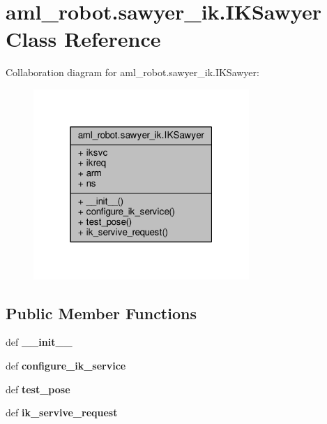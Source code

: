 \hypertarget{classaml__robot_1_1sawyer__ik_1_1_i_k_sawyer}{\section{aml\-\_\-robot.\-sawyer\-\_\-ik.\-I\-K\-Sawyer Class Reference}
\label{classaml__robot_1_1sawyer__ik_1_1_i_k_sawyer}
}


Collaboration diagram for aml\-\_\-robot.\-sawyer\-\_\-ik.\-I\-K\-Sawyer\-:\nopagebreak
\begin{figure}[H]
\begin{center}
\leavevmode
\includegraphics[width=232pt]{classaml__robot_1_1sawyer__ik_1_1_i_k_sawyer__coll__graph}
\end{center}
\end{figure}
\subsection*{Public Member Functions}
\begin{DoxyCompactItemize}
\item 
\hypertarget{classaml__robot_1_1sawyer__ik_1_1_i_k_sawyer_a65178d63636b88d3d2e408e935c99942}{def {\bfseries \-\_\-\-\_\-init\-\_\-\-\_\-}}\label{classaml__robot_1_1sawyer__ik_1_1_i_k_sawyer_a65178d63636b88d3d2e408e935c99942}

\item 
\hypertarget{classaml__robot_1_1sawyer__ik_1_1_i_k_sawyer_a00d497c052f10e0aa35725d2f3b10011}{def {\bfseries configure\-\_\-ik\-\_\-service}}\label{classaml__robot_1_1sawyer__ik_1_1_i_k_sawyer_a00d497c052f10e0aa35725d2f3b10011}

\item 
\hypertarget{classaml__robot_1_1sawyer__ik_1_1_i_k_sawyer_a979a1ec545060a095c80780032d9e357}{def {\bfseries test\-\_\-pose}}\label{classaml__robot_1_1sawyer__ik_1_1_i_k_sawyer_a979a1ec545060a095c80780032d9e357}

\item 
\hypertarget{classaml__robot_1_1sawyer__ik_1_1_i_k_sawyer_af43ddd8058cd9aa509e1f9d35162bc65}{def {\bfseries ik\-\_\-servive\-\_\-request}}\label{classaml__robot_1_1sawyer__ik_1_1_i_k_sawyer_af43ddd8058cd9aa509e1f9d35162bc65}

\end{DoxyCompactItemize}
